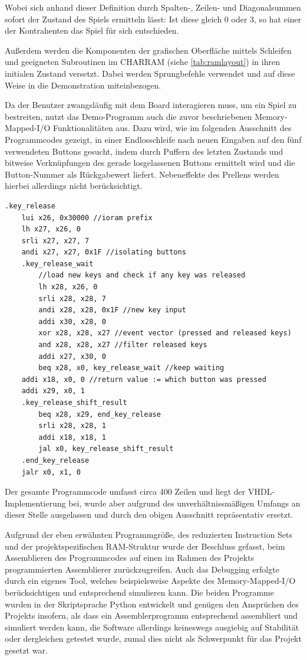 Wobei sich anhand dieser Definition durch Spalten-, Zeilen- und Diagonalsummen sofort der Zustand des Spiels ermitteln l\"asst: Ist diese gleich 0 oder 3, so hat einer der Kontrahenten das Spiel f\"ur sich entschieden.

Au\ss{}erdem werden die Komponenten der grafischen Oberfl\"ache mittels Schleifen und geeigneten Subroutinen im CHARRAM (siehe \ref{tab:ramlayout}) in ihren initialen Zustand versetzt. Dabei werden Sprungbefehle verwendet und auf diese Weise in die Demonstration miteinbezogen.

Da der Benutzer zwangsl\"aufig mit dem Board interagieren muss, um ein Spiel zu bestreiten, nutzt das Demo-Programm auch die zuvor beschriebenen Memory-Mapped-I/O Funktionalit\"aten aus. Dazu wird, wie im folgenden Ausschnitt des Programmcodes gezeigt, in einer Endlosschleife nach neuen Eingaben auf den f\"unf verwendeten Buttons gesucht, indem durch Puffern des letzten Zustands und bitweise Verkn\"upfungen des gerade losgelassenen Buttons ermittelt wird und die Button-Nummer als R\"uckgabewert liefert. Nebeneffekte des Prellens werden hierbei allerdings nicht ber\"ucksichtigt.

\begin{lstlisting}
.key_release
	lui x26, 0x30000 //ioram prefix
	lh x27, x26, 0
	srli x27, x27, 7
	andi x27, x27, 0x1F //isolating buttons
	.key_release_wait
		//load new keys and check if any key was released
		lh x28, x26, 0
		srli x28, x28, 7
		andi x28, x28, 0x1F //new key input
		addi x30, x28, 0
		xor x28, x28, x27 //event vector (pressed and released keys)
		and x28, x28, x27 //filter released keys
		addi x27, x30, 0
		beq x28, x0, key_release_wait //keep waiting
	addi x18, x0, 0 //return value := which button was pressed
	addi x29, x0, 1
	.key_release_shift_result
		beq x28, x29, end_key_release
		srli x28, x28, 1
		addi x18, x18, 1
		jal x0, key_release_shift_result
	.end_key_release
	jalr x0, x1, 0
\end{lstlisting}

Der gesamte Programmcode umfasst circa 400 Zeilen und liegt der VHDL-Implementierung bei, wurde aber aufgrund des unverh\"altnissm\"a\ss{}igen Umfangs an dieser Stelle ausgelassen und durch den obigen Ausschnitt repr\"asentativ ersetzt.


Aufgrund der eben erw\"ahnten Programmgr\"o\ss{}e, des reduzierten Instruction Sets und der projektspezifischen RAM-Struktur wurde der Beschluss gefasst, beim Assemblieren des Programmcodes auf einen im Rahmen des Projekts programmierten Assemblierer zur\"uckzugreifen. Auch das Debugging erfolgte durch ein eigenes Tool, welches beispielsweise Aspekte des Memory-Mapped-I/O ber\"ucksichtigen und entsprechend simulieren kann. Die beiden Programme wurden in der Skriptsprache Python entwickelt und gen\"ugen den Anspr\"uchen des Projekts insofern, als dass ein Assemblerprogramm entsprechend assembliert und simuliert werden kann, die Software allerdings keineswegs ausgiebig auf Stabilit\"at oder dergleichen getestet wurde, zumal dies nicht als Schwerpunkt f\"ur das Projekt gesetzt war.

